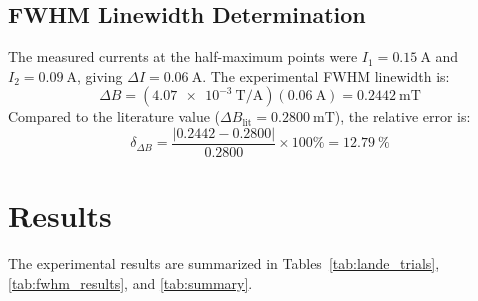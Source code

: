 \documentclass[journal]{IEEEtran}
\begin{document}
\subsection{FWHM Linewidth Determination}
The measured currents at the half-maximum points were $I_1 = \SI{0.15}{\ampere}$ and $I_2 = \SI{0.09}{\ampere}$, giving $\Delta I = \SI{0.06}{\ampere}$. The experimental FWHM linewidth is:
\begin{equation}
    \Delta B = (\SI{4.07e-3}{\tesla\per\ampere}) (\SI{0.06}{\ampere}) = \SI{0.2442}{\milli\tesla}
\end{equation}
Compared to the literature value ($\Delta B_{\text{lit}} = \SI{0.2800}{\milli\tesla}$), the relative error is:
\begin{equation}
    \delta_{\Delta B} = \frac{|0.2442 - 0.2800|}{0.2800} \times 100\% = \SI{12.79}{\percent}
\end{equation}

\section{Results}
The experimental results are summarized in Tables~\ref{tab:lande_trials}, \ref{tab:fwhm_results}, and \ref{tab:summary}.

\begin{table}[htbp]
    \centering
    \caption{Experimental Trials for Land\'e $g$-Factor.}
    \label{tab:lande_trials}
\end{table}

\begin{table}[htbp]
    \centering
    \caption{Experimental Linewidth and FWHM Determination.}
    \label{tab:fwhm_results}
\end{table}
\end{document}
